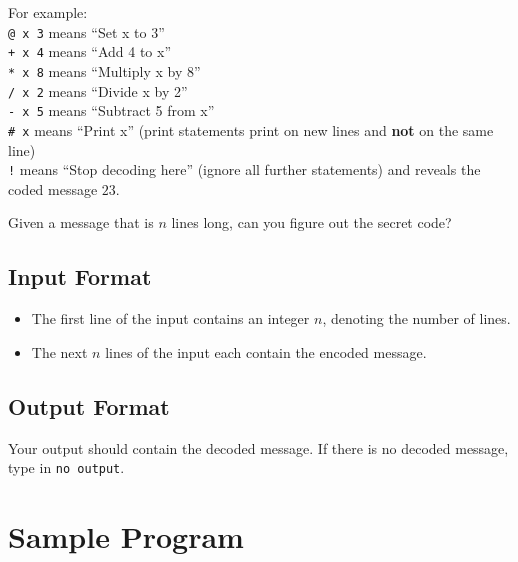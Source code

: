 \documentclass[12pt]{report}
\begin{document}
	For example:\\
	\texttt{@ x 3} means ``Set x to 3''\\
	\texttt{+ x 4} means ``Add 4 to x''\\
	\texttt{* x 8} means ``Multiply x by 8''\\
	\texttt{/ x 2} means ``Divide x by 2''\\
	\texttt{- x 5} means ``Subtract 5 from x''\\
	\texttt{\# x} means ``Print x'' (print statements print on new lines and \textbf{not} on the same line)\\
	\texttt{!} means ``Stop decoding here'' (ignore all further statements)
	and reveals the coded message $23$.
	
	Given a message that is $n$ lines long, can you figure out the secret code?

	\subsection*{Input Format}
	\begin{itemize}
		\item The first line of the input contains an integer $n$, denoting the number of lines.
		\item The next $n$ lines of the input each contain the encoded message.
	\end{itemize}
	\subsection*{Output Format}
	Your output should contain the decoded message. If there is no decoded message, type in \texttt{no output}.

\section*{Sample Program}
	
	
\end{document}
